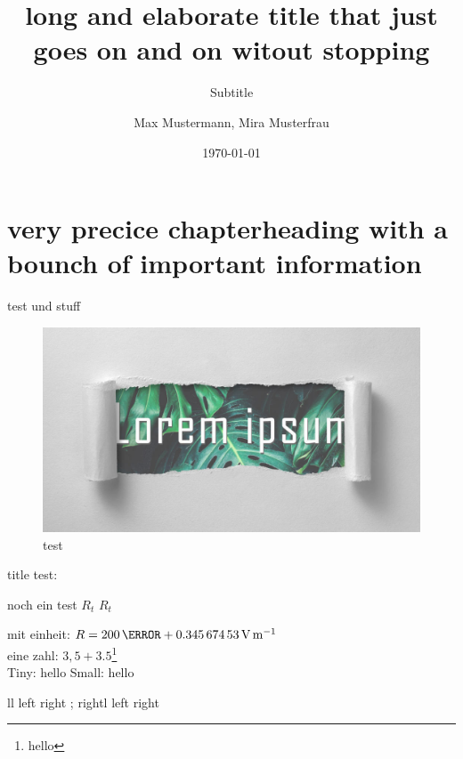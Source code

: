 \documentclass[todos,f1]{HsH-report}
\author{
	Max Mustermann,
	Mira Musterfrau
}
\title[short title]{long and elaborate title that just goes on and on witout stopping}
\subtitle{Subtitle}
\date{\today}
\begin{document}
\maketitle
\declarationAuthorship

\begin{abstract}
	\lipsum[5-8]
\end{abstract}

\tableofcontents

\cleardoublepage %

\chapter{very precice chapterheading with a bounch of important information}
	\label{chap: one}
	{\color{red}test} und stuff
	\begin{figure}
		\centering
		\includegraphics[width=.6\textwidth]{img/lorem-ipsum.jpg}
		\caption{test}
	\end{figure}

	title test: \ifx\@shorttitle\@empty\@title\else\@shorttitle\fi

	noch ein test \normalsubscripts$R_t$ \upsubscripts$R_t$

	mit einheit: $R=200\,\mohm+ \SI{0.34567453}{\volt\per\metre}$
	\cite{laboranleitung:physik}
	\vspace{2cm}\\
	eine zahl: $3,5+3.5$\footnote[1]{hello}\\

	Tiny: {\tiny hello}  Small: {\small hello}

	\makeatletter
	\newcommand{\test}[1][l]{
		{
			\def\t{#1}
			\if\t l left
			\else
				right
			\fi
		}
	}
	\test; \test[right] 

	\lipsum[5-6]
\end{document}
